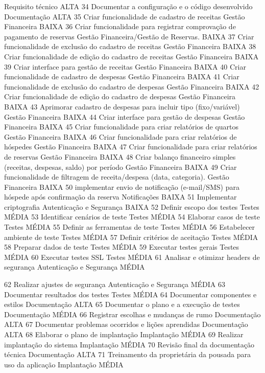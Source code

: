 	Requisito técnico
	ALTA
	34
	Documentar a configuração e o código desenvolvido 
	Documentação
	ALTA
	35
	Criar funcionalidade de cadastro de receitas
	Gestão Financeira
	BAIXA 
	36
	Criar funcionalidade para registrar comprovação de pagamento de reservas 
	Gestão Financeira/Gestão de Reservas.
	BAIXA 
	37
	Criar funcionalidade de exclusão do cadastro de receitas
	Gestão Financeira
	BAIXA 
	38
	Criar funcionalidade de edição do cadastro de receitas
	Gestão Financeira
	BAIXA 
	39
	Criar interface para gestão de receitas
	Gestão Financeira
	BAIXA 
	40
	Criar funcionalidade de cadastro de despesas
	Gestão Financeira
	BAIXA 
	41
	Criar funcionalidade de exclusão do cadastro de despesas
	Gestão Financeira
	BAIXA 
	42
	Criar funcionalidade de edição do cadastro de despesas
	Gestão Financeira
	BAIXA 
	43
	Aprimorar cadastro de despesas para incluir tipo (fixo/variável)
	Gestão Financeira
	BAIXA 
	44
	Criar interface para gestão de despesas
	Gestão Financeira
	BAIXA 
	45
	Criar funcionalidade para criar relatórios de quartos
	Gestão Financeira
	BAIXA 
	46
	Criar funcionalidade para criar relatórios de hóspedes
	Gestão Financeira
	BAIXA 
	47
	Criar funcionalidade para criar relatórios de reservas
	Gestão Financeira
	BAIXA 
	48
	Criar balanço financeiro simples (receitas, despesas, saldo) por período
	Gestão Financeira
	BAIXA 
	49
	Criar funcionalidade de filtragem de receita/despesa (data, categoria).
	Gestão Financeira
	BAIXA 
	50
	implementar envio de notificação (e-mail/SMS) para hóspede após confirmação da reserva
	Notificações
	BAIXA 
	51
	Implementar criptografia 
	Autenticação e Segurança
	BAIXA 
	52
	Definir escopo dos testes
	Testes
	MÉDIA
	53
	Identificar cenários de teste
	Testes
	MÉDIA
	54
	Elaborar casos de teste
	Testes
	MÉDIA
	55
	Definir as ferramentas de teste
	Testes
	MÉDIA
	56
	Estabelecer ambiente de teste
	Testes
	MÉDIA
	57
	Definir critérios de aceitação
	Testes
	MÉDIA
	58
	Preparar dados de teste
	Testes
	MÉDIA
	59
	Executar testes gerais
	Testes
	MÉDIA
	60
	Executar testes SSL
	Testes
	MÉDIA
	61
	Analisar e otimizar headers de segurança
	Autenticação e Segurança
	MÉDIA
	

62
	Realizar ajustes de segurança
	Autenticação e Segurança
	MÉDIA
	63
	Documentar resultados dos testes
	Testes
	MÉDIA
	64
	Documentar componentes e estilos
	Documentação
	ALTA
	65
	Documentar o plano e a execução de testes
	Documentação
	MÉDIA
	66
	Registrar escolhas e mudanças de rumo
	Documentação
	ALTA
	67
	Documentar problemas ocorridos e lições aprendidas
	Documentação
	ALTA
	68
	Elaborar o plano de implantação
	Implantação
	MÉDIA
	69
	Realizar implantação do sistema
	Implantação
	MÉDIA
	70
	Revisão final da documentação técnica
	Documentação
	ALTA
	71
	Treinamento da proprietária da pousada para uso da aplicação
	Implantação
	MÉDIA
	


